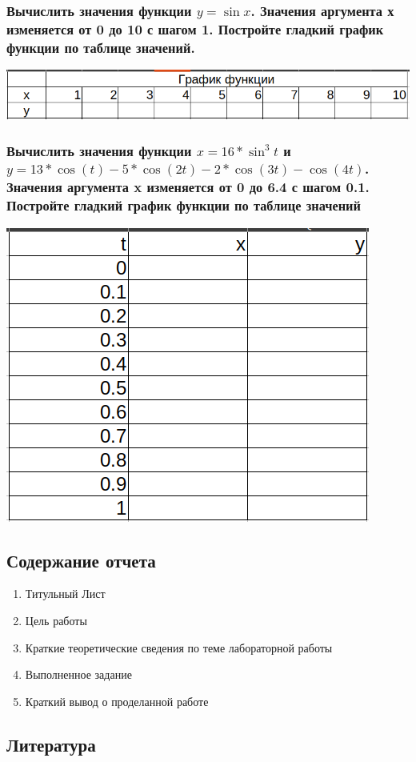 \documentclass[a4paper]{article}
\begin{document}
\subsubsection{Вычислить значения функции $y=\sin x$. Значения аргумента х изменяется от 0 до 10 с шагом 1. Постройте гладкий  график функции по таблице значений.}

\includegraphics[width=\textwidth]{t2.png}

\subsubsection{Вычислить значения функции $x=16 * \sin^{3}t$ и $y = 13 * \cos(t) - 5 * \cos(2t) - 2 * \cos(3t) - \cos(4t)$. Значения аргумента x изменяется  от 0 до 6.4 с шагом 0.1. Постройте гладкий график функции по таблице значений}

\includegraphics[width=\textwidth]{t3.png}

\subsubsection{}

\newpage
\subsection{Содержание отчета}
\begin{enumerate}
  \item Титульный Лист
  \item Цель работы
  \item Краткие теоретические сведения по теме лабораторной работы
  \item Выполненное задание
  \item Краткий вывод о проделанной работе
\end{enumerate}

\subsection{Литература}
\end{document}
